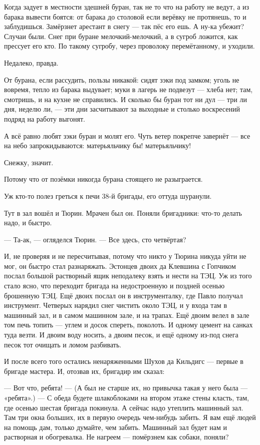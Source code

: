 Когда задует в местности здешней буран, так не то что на работу не ведут, а из барака вывести боятся: от барака до столовой если верёвку не протянешь, то и заблудишься. Замёрзнет арестант в снегу --- так пёс его ешь. А ну-ка убежит? Случаи были. Снег при буране мелочкий-мелочкий, а в сугроб ложится, как прессует его кто. По такому сугробу, через проволоку перемётанному, и уходили.

Недалеко, правда.

От бурана, если рассудить, пользы никакой: сидят зэки под замком; уголь не вовремя, тепло из барака выдувает; муки в лагерь не подвезут --- хлеба нет; там, смотришь, и на кухне не справились. И сколько бы буран тот ни дул --- три ли дня, неделю ли, --- эти дни засчитывают за выходные и столько воскресений подряд на работу выгонят.

А всё равно любят зэки буран и молят его. Чуть ветер покрепче завернёт --- все на небо запрокидываются: матерьяльчику бы! матерьяльчику!

Снежку, значит.

Потому что от позёмки никогда бурана стоящего не разыграется.

Уж кто-то полез греться к печи 38-й бригады, его оттуда шуранули.

Тут в зал вошёл и Тюрин. Мрачен был он. Поняли бригадники: что-то делать надо, и быстро.

--- Та-ак, --- огляделся Тюрин. --- Все здесь, сто четвёртая?

И, не проверяя и не пересчитывая, потому что никто у Тюрина никуда уйти не мог, он быстро стал разнаряжать. Эстонцев двоих да Клевшина с Гопчиком послал большой растворный ящик неподалеку взять и нести на ТЭЦ. Уж из того стало ясно, что переходит бригада на недостроенную и поздней осенью брошенную ТЭЦ. Ещё двоих послал он в инструменталку, где Павло получал инструмент. Четверых нарядил снег чистить около ТЭЦ, и у входа там в машинный зал, и в самом машинном зале, и на трапах. Ещё двоим велел в зале том печь топить --- углем и досок спереть, поколоть. И одному цемент на санках туда везти. И двоим воду носить, а двоим песок, и ещё одному из-под снега песок тот очищать и ломом разбивать.

И после всего того остались ненаряженными Шухов да Кильдигс --- первые в бригаде мастера. И, отозвав их, бригадир им сказал:

--- Вот что, ребята! --- (А был не старше их, но привычка такая у него была --- «ребята».) --- С обеда будете шлакоблоками на втором этаже стены класть, там, где осенью шестая бригада покинула. А сейчас надо утеплить машинный зал. Там три окна больших, их в первую очередь чем-нибудь забить. Я вам ещё людей на помощь дам, только думайте, чем забить. Машинный зал будет нам и растворная и обогревалка. Не нагреем --- помёрзнем как собаки, поняли?

